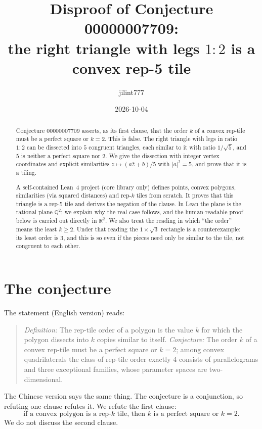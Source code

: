 \documentclass[11pt]{article}
\title{Disproof of Conjecture 00000007709:\\
the right triangle with legs $1:2$ is a convex rep-5 tile}
\author{jilint777}
\date{2026-10-04}
\theoremstyle{definition}
\theoremstyle{remark}
\begin{document}
\sloppy
\maketitle

\begin{abstract}
Conjecture 00000007709 asserts, as its first clause, that the order $k$ of a convex
rep-tile must be a perfect square or $k=2$. This is false. The right triangle with
legs in ratio $1:2$ can be dissected into $5$ congruent triangles, each similar to it
with ratio $1/\sqrt5$, and $5$ is neither a perfect square nor $2$. We give the
dissection with integer vertex coordinates and explicit similarities
$z\mapsto(a\bar z+b)/5$ with $|a|^2=5$, and prove that it is a tiling.

A self-contained Lean~4 project (core library only) defines points, convex polygons,
similarities (via squared distances) and rep-$k$ tiles from scratch. It proves that this
triangle is a rep-5 tile and derives the negation of the clause. In Lean the plane is the
rational plane $\mathbb Q^2$; we explain why the real case follows, and the
human-readable proof below is carried out directly in $\mathbb R^2$. We also treat the
reading in which ``the order'' means the least $k\ge2$. Under that reading the
$1\times\sqrt3$ rectangle is a counterexample: its least order is $3$, and this is so
even if the pieces need only be similar to the tile, not congruent to each other.
\end{abstract}

\section{The conjecture}

The statement (English version) reads:
\begin{quote}
\emph{Definition:} The rep-tile order of a polygon is the value $k$ for which the polygon
dissects into $k$ copies similar to itself. \emph{Conjecture:} The order $k$ of a convex
rep-tile must be a perfect square or $k=2$; among convex quadrilaterals the class of
rep-tile order exactly $4$ consists of parallelograms and three exceptional families,
whose parameter spaces are two-dimensional.
\end{quote}
The Chinese version says the same thing. The conjecture is a conjunction, so refuting
one clause refutes it. We refute the first clause:
\begin{equation}\label{eq:clause}
\text{if a convex polygon is a rep-}k\text{ tile, then } k \text{ is a perfect square or } k=2.
\end{equation}
We do not discuss the second clause.
\end{document}
